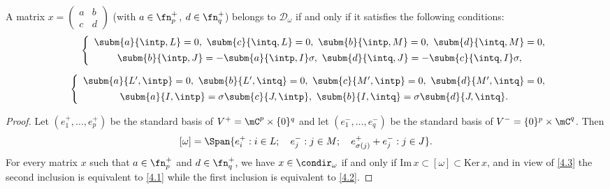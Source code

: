 \begin{lemma}
\label{L4.2}
A matrix $x=\begin{pmatrix} a & b\\ c & d \end{pmatrix}$ \textup{(}with $a\in\fn_p^+$, $d\in\fn_q^+$\textup{)} belongs to $\mathcal{D}_\omega$ if and only if it satisfies the following conditions:
\begin{eqnarray}
&& \left\{\begin{array}{c} \subm{a}{\intp,L}=0,\ \subm{c}{\intq,L}=0,\ \subm{b}{\intp,M}=0,\ \subm{d}{\intq,M}=0,\\[1.5mm]
{} \subm{b}{\intp,J}=-\subm{a}{\intp,I}\sigma,\ \subm{d}{\intq,J}=-\subm{c}{\intq,I}\sigma, \end{array}\right. \label{4.1}\\[2mm]
&& \left\{\begin{array}{c} \subm{a}{L',\intp}=0,\ \subm{b}{L',\intq}=0,\ \subm{c}{M',\intp}=0,\ \subm{d}{M',\intq}=0,\\[1.5mm]
{} \subm{a}{I,\intp}=\sigma \subm{c}{J,\intp},\ \subm{b}{I,\intq}=\sigma\subm{d}{J,\intq}.
\end{array}\right. \label{4.2}
\end{eqnarray}
\end{lemma}

\begin{proof}
Let $(e_1^+,\ldots,e_p^+)$ be the standard basis of $V^+=\mC^p\times\{0\}^q$ and let $(e_1^-,\ldots,e_q^-)$ be the standard basis of $V^-=\{0\}^p\times\mC^q$. Then
\begin{equation}
\label{4.3}
[\omega]=\Span{e_i^+:i\in L;\quad e_j^-:j\in M;\quad e_{\sigma(j)}^++e_j^-:j\in J}.
\end{equation}
For every matrix $x$ such that $a\in\fn_p^+$ and $d\in\fn_q^+$, we have $x\in\condir_\omega$ if and only if $\mathrm{Im}\,x\subset[\omega]\subset \mathrm{Ker}\,x$, and in view of \eqref{4.3} the second inclusion is equivalent to \eqref{4.1} while the first inclusion is equivalent to \eqref{4.2}.
\end{proof}

